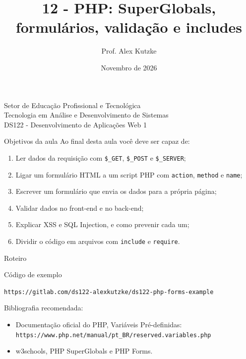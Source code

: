 \documentclass{beamer}
\title{12 - PHP: SuperGlobals, formulários, validação e includes}
\author{Prof. Alex Kutzke}
\date{Novembro de 2026}
\begin{document}
\begin{frame}
	\begin{center}
		\large{Setor de Educação Profissional e Tecnológica}\\
		Tecnologia em Análise e Desenvolvimento de Sistemas\\
		\vspace{1cm}
		\small{DS122 - Desenvolvimento de Aplicações Web 1}
	\end{center}
	\titlepage
\end{frame}

\begin{frame}{Objetivos da aula}
	Ao final desta aula você deve ser capaz de:
	\begin{enumerate}
		\item Ler dados da requisição com \texttt{\$\_GET}, \texttt{\$\_POST} e
		      \texttt{\$\_SERVER};
		\item Ligar um formulário HTML a um script PHP com \texttt{action},
		      \texttt{method} e \texttt{name};
		\item Escrever um formulário que envia os dados para a própria página;
		\item Validar dados no front-end e no back-end;
		\item Explicar XSS e SQL Injection, e como prevenir cada um;
		\item Dividir o código em arquivos com \texttt{include} e
		      \texttt{require}.
	\end{enumerate}
\end{frame}

\begin{frame}{Roteiro}
	\tableofcontents
\end{frame}

\begin{frame}{Código de exemplo}
	\begin{center}
		{\small\mbox{\texttt{https://gitlab.com/ds122-alexkutzke/ds122-php-forms-example}}}
	\end{center}

	\vspace{0.3cm}
	Bibliografia recomendada:
	\begin{itemize}
		\item Documentação oficial do PHP, Variáveis Pré-definidas:\\
		      {\small\mbox{\texttt{https://www.php.net/manual/pt\_BR/reserved.variables.php}}}
		\item w3schools, PHP SuperGlobals e PHP Forms.
	\end{itemize}
\end{frame}
\end{document}
